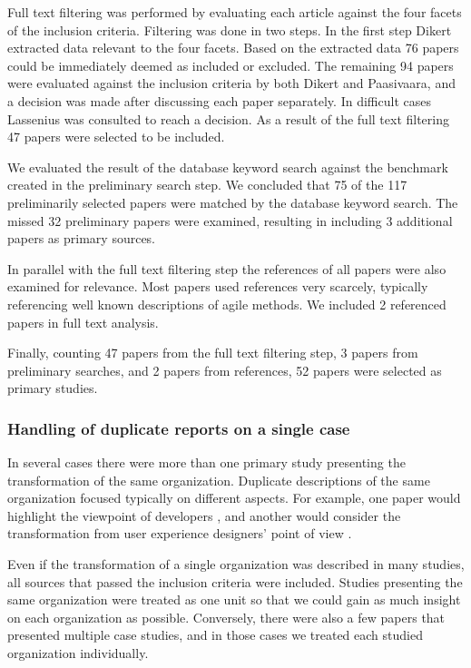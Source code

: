 Full text filtering was performed by evaluating each article against the four
facets of the inclusion criteria. Filtering was done in two steps. In the first
step Dikert extracted data relevant to the four facets. Based on the extracted
data 76 papers could be immediately deemed as included or excluded. The
remaining 94 papers were evaluated against the inclusion criteria by both Dikert
and Paasivaara, and a decision was made after discussing each paper separately.
In difficult cases Lassenius was consulted to reach a decision. As a result of
the full text filtering 47 papers were selected to be included.

We evaluated the result of the database keyword search against the benchmark
created in the preliminary search step. We concluded that 75 of the 117
preliminarily selected papers were matched by the database keyword search.
The missed 32 preliminary papers were examined, resulting in including 3
additional papers as primary sources.

In parallel with the full text filtering step the references of all papers were
also examined for relevance. Most papers used references very scarcely, typically
referencing well known descriptions of agile methods. We included 2 referenced
papers in full text analysis.

Finally, counting 47 papers from the full text filtering step, 3 papers from
preliminary searches, and 2 papers from references, 52 papers were selected
as primary studies.


\subsubsection{Handling of duplicate reports on a single case}

In several cases there were more than one primary study presenting the
transformation of the same organization. Duplicate descriptions of the same
organization focused typically on different aspects. For example, one paper
would highlight the viewpoint of developers \cite{Fry2007}, and another would
consider the transformation from user experience designers' point of view
\cite{Federoff2009}.

Even if the transformation of a single organization was described in many
studies, all sources that passed the inclusion criteria were included. Studies
presenting the same organization were treated as one unit so that we could gain
as much insight on each organization as possible. Conversely, there were also a
few papers that presented multiple case studies, and in those cases we treated
each studied organization individually.

